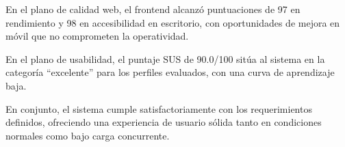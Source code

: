 En el plano de calidad web, el frontend alcanzó puntuaciones de 97 en rendimiento y 98 en accesibilidad en escritorio, con oportunidades de mejora en móvil que no comprometen la operatividad.

En el plano de usabilidad, el puntaje SUS de 90.0/100 sitúa al sistema en la categoría ``excelente'' para los perfiles evaluados, con una curva de aprendizaje baja.

En conjunto, el sistema cumple satisfactoriamente con los requerimientos definidos, ofreciendo una experiencia de usuario sólida tanto en condiciones normales como bajo carga concurrente.
